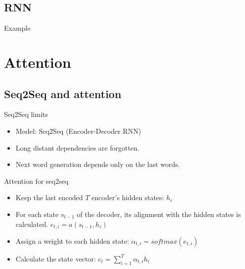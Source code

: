 \documentclass{KBook}
\begin{document}
\subsection{RNN}

Example
	
	

\section{Attention}


\subsection{Seq2Seq and attention}

Seq2Seq limits
	
	\begin{center}
	\end{center}
	
	\begin{itemize}
		\item Model: Seq2Seq (Encoder-Decoder RNN)
		\item Long distant dependencies are forgotten.
		\item Next word generation depends only on the last words.
	\end{itemize}
	
Attention for seq2seq
	
	\begin{center}
	\end{center}
	
	\vskip-6pt
	\begin{itemize}
		\item Keep the last encoded $T$ encoder's hidden states: $h_i$
		\item For each state $s_{t-1}$ of the decoder, its alignment with the hidden states is calculated.
		$ e_{t, i} = a(s_{t-1}, h_i) $
		\item Assign a weight to each hidden state: $\alpha_{t, i} = softmax(e_{t, i})$
		\item Calculate the state vector: $c_t = \sum_{i=1}^{T} \alpha_{t, i} h_i$
	\end{itemize}
	
\end{document}
